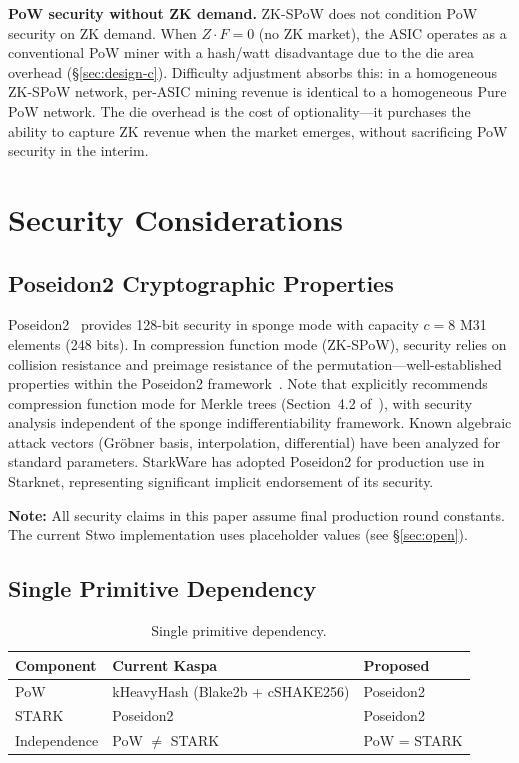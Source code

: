 \documentclass[11pt,a4paper]{article}
\begin{document}
\textbf{PoW security without ZK demand.} ZK-SPoW does not condition PoW security on ZK demand. When $Z \cdot F = 0$ (no ZK market), the ASIC operates as a conventional PoW miner with a hash/watt disadvantage due to the die area overhead (\S\ref{sec:design-c}). Difficulty adjustment absorbs this: in a homogeneous ZK-SPoW network, per-ASIC mining revenue is identical to a homogeneous Pure PoW network. The die overhead is the cost of optionality---it purchases the ability to capture ZK revenue when the market emerges, without sacrificing PoW security in the interim.

\section{Security Considerations}
\label{sec:security}

\subsection{Poseidon2 Cryptographic Properties}

Poseidon2~\cite{poseidon2} provides 128-bit security in sponge mode with capacity $c = 8$ M31 elements (248 bits). In compression function mode (ZK-SPoW), security relies on collision resistance and preimage resistance of the permutation---well-established properties within the Poseidon2 framework~\cite{poseidon2}. Note that \cite{poseidon2} explicitly recommends compression function mode for Merkle trees (Section~4.2 of~\cite{poseidon2}), with security analysis independent of the sponge indifferentiability framework. Known algebraic attack vectors (Gr\"obner basis, interpolation, differential) have been analyzed for standard parameters. StarkWare has adopted Poseidon2 for production use in Starknet, representing significant implicit endorsement of its security.

\textbf{Note:} All security claims in this paper assume final production round constants. The current Stwo implementation uses placeholder values (see \S\ref{sec:open}).

\subsection{Single Primitive Dependency}

\begin{table}[h]
\centering
\begin{tabular}{@{}lll@{}}
\toprule
Component & Current Kaspa & Proposed \\
\midrule
PoW & kHeavyHash (Blake2b + cSHAKE256) & Poseidon2 \\
STARK & Poseidon2 & Poseidon2 \\
Independence & PoW $\neq$ STARK & PoW = STARK \\
\bottomrule
\end{tabular}
\caption{Single primitive dependency.}
\label{tab:dependency}
\end{table}
\end{document}
